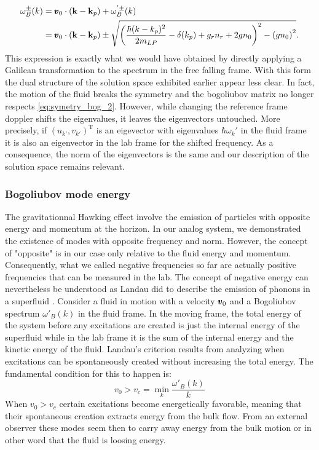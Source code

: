\begin{equation}
    \begin{aligned}
    \omega^{\pm}_B(k)&=\pmb{v}_0\cdot(\mathbf{k}-\mathbf{k}_p)+\omega^{'\pm}_B(k) \\
            &=\pmb{v}_0\cdot(\mathbf{k}-\mathbf{k}_p)\pm\sqrt{\left(\dfrac{\hbar(k-k_p)^2}{2m_{LP}}-\delta(k_p)+ g_rn_r +2g n_0\right)^2 - \left(g n_0\right)^2}.
    \label{eq:bogo_lab_frame}
    \end{aligned}
\end{equation}
This expression is exactly what we would have obtained by directly applying a Galilean transformation to the spectrum in the free falling frame. With this form
the dual structure of the solution space exhibited earlier appear less clear. In fact, the motion of the fluid breaks the symmetry and the bogoliubov matrix no longer respects \autoref{eq:symetry_bog_2}. However, while changing the reference frame doppler shifts the eigenvalues, it leaves the eigenvectors untouched. More precisely, if $(u_{k'},v_{k'})^{\mathrm{T}}$ is an eigevector with eigenvalues $\hbar\omega_k'$ in the fluid frame it is also an eigenvector 
in the lab frame for the shifted frequency. As a consequence, the norm of the eigenvectors is the same and our description of the solution space remains relevant.

\subsubsection{Bogoliubov mode energy}
The gravitationnal Hawking effect involve the emission of particles with opposite energy and momentum at the horizon. In our analog
system, we demonstrated the existence of modes with opposite frequency and norm. However, the concept of "opposite" is in our case only relative to the fluid energy and momentum. Consequently, what we
called negative frequencies so far are actually positive frequencies that can be measured in the lab. The concept of negative energy can nevertheless be understood as Landau did 
to describe the emission of phonons in a superfluid \cite{landau_superfluidity_1941}. Consider a fluid in motion with a velocity $\pmb{v}_0$ and a Bogoliubov spectrum $\omega'_B(k)$ in the fluid frame. 
In the moving frame, the total energy of the system before any excitations are created is just the internal energy of the superfluid while in the lab frame it is the sum of the internal energy and the kinetic energy of the fluid.
Landau's criterion results from analyzing when excitations can be spontaneously created without increasing the total energy. The fundamental condition for this to happen is:
\begin{equation}
    v_0>v_c = \min_k \dfrac{\omega'_B(k)}{k}
\end{equation}
When $v_0>v_c$ certain excitations become energetically favorable, meaning that their spontaneous creation extracts energy from the bulk flow. From
an external observer these modes seem then to carry away energy from the bulk motion or in other word that the fluid is loosing energy. 

